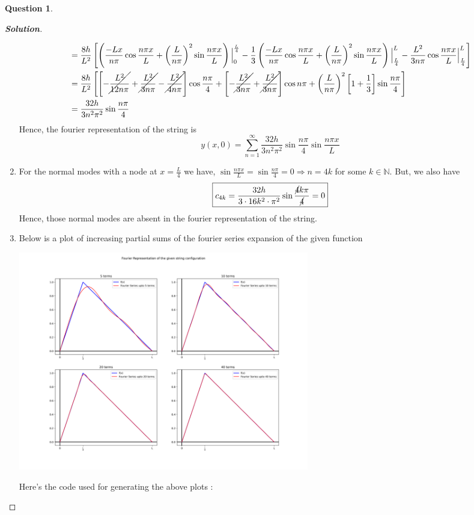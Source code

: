 \documentclass[10pt]{scrartcl}
\theoremstyle{definition}
\newtheorem{exercise}{Question}
\newenvironment{solution} {\begin{proof}[\normalfont \textbf{Solution}]} {\end{proof}}
\newcommand{\nn}{\mathbb{N}}
\newcommand{\npixL}{\frac{n\pi x}{L}}
\begin{document}
\begin{exercise}
\begin{solution}
\begin{enumerate}[label={(\alph*)}]
\begin{align*}
                        &= \frac{8h}{L^2}\left[\left(\frac{-Lx}{n\pi}\cos \npixL + \left(\frac{L}{n \pi}\right)^2 \sin \npixL\right)\Big|_{0}^{\frac{L}{4}} -\frac{1}{3}\left(\frac{-Lx}{n\pi}\cos \npixL + \left(\frac{L}{n \pi}\right)^2 \sin \npixL\right)\Big|_{\frac{L}{4}}^{L} - \frac{L^2}{3n\pi} \cos\npixL \Big|_{\frac{L}{4}}^{L}\right] \\
                        &= \frac{8h}{L^2}\left[\left[-\cancel{\frac{L^2}{12n\pi}} + \cancel{\frac{L^2}{3n\pi}} - \cancel{\frac{L^2}{4n\pi}}\right]\cos\frac{n\pi}{4} + \left[-\cancel{\frac{L^2}{3n\pi}}+\cancel{\frac{L^2}{3n\pi}}\right]\cos n\pi + \left(\frac{L}{n\pi}\right)^2\left[1 + \frac{1}{3}\right]\sin \frac{n\pi}{4}\right] \\
                        &= \frac{32h}{3n^2 \pi^2}\sin \frac{n\pi}{4}
                \end{align*}
                Hence, the fourier representation of the string is 
                $$\boxed{y(x,0) = \sum_{n=1}^{\infty}\frac{32h}{3n^2 \pi^2}\sin \frac{n\pi}{4} \sin\npixL}$$
            \item For the normal modes with a node at $x = \frac{L}{4}$ we have, $\sin\npixL = \sin \frac{n\pi}{4}= 0 \Rightarrow n = 4k$ for some $k \in \nn$.
                But, we also have 
                $$\boxed{c_{4k} = \frac{32h}{3\cdot16k^2\cdot\pi^2}\sin\frac{\cancel{4}k\pi}{\cancel{4}} = 0}$$
                Hence, those normal modes are absent in the fourier representation of the string.
            \item 
    Below is a plot of increasing partial sums of the fourier series expansion of the given function

    \includegraphics[width = 5.0in]{fourier_series_1.png}

    Here's the code used for generating the above plots :

    
        \end{enumerate}
    \end{solution}
\end{exercise}
\end{document}
